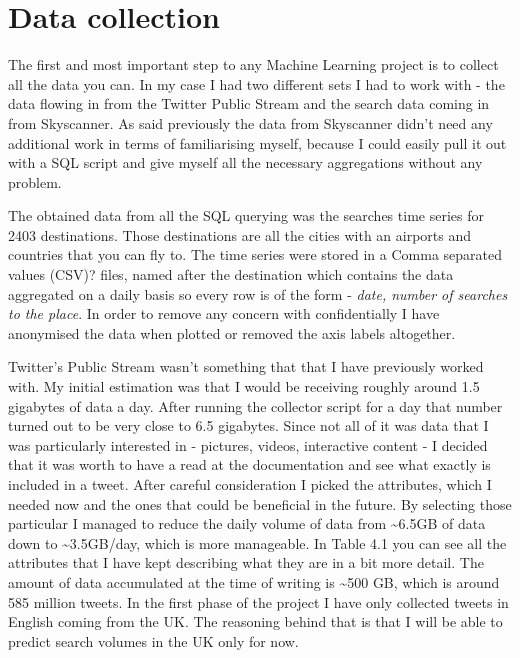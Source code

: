 \documentclass[minf,twoside,singlespacing,parskip,frontabs]{infthesis}
\begin{document}
\section{Data collection}
\label{sec:dc}


The first and most important step to any Machine Learning project is to collect all the data you can. In my case I had two different sets I had to work with - the data flowing in from the Twitter Public Stream and the search data coming in from Skyscanner. As said previously the data from Skyscanner didn't need any additional work in terms of familiarising myself, because I could easily pull it out with a SQL script and give myself all the necessary aggregations without any problem. 


The obtained data from all the SQL querying was the searches time series for 2403 destinations. Those destinations are all the cities with an airports and countries that you can fly to. The time series were stored in a Comma separated values (CSV)? files, named after the destination which contains the data aggregated on a daily basis so every row is of the form - \textit{date, number of searches to the place}. In order to remove any concern with confidentially I have anonymised the data when plotted or removed the axis labels altogether. 


Twitter's Public Stream wasn't something that that I have previously worked with. My initial estimation was that I would be receiving roughly around 1.5 gigabytes of data a day. After running the collector script for a day that number turned out to be very close to 6.5 gigabytes. Since not all of it was data that I was particularly interested in - pictures, videos, interactive content - I decided that it was worth to have a read at the documentation and see what exactly is included in a tweet. \cite{tweetobject} After careful consideration I picked the attributes, which I needed now and the ones that could be beneficial in the future. By selecting those particular I managed to reduce the daily volume of data from \textasciitilde 6.5GB of data down to \textasciitilde 3.5GB/day, which is more manageable. In Table 4.1 you can see all the attributes that I have kept describing what they are in a bit more detail. The amount of data accumulated at the time of writing is \textasciitilde 500 GB, which is around 585 million tweets. In the first phase of the project I have only collected tweets in English coming from the UK. The reasoning behind that is that I will be able to predict search volumes in the UK only for now.
\end{document}
